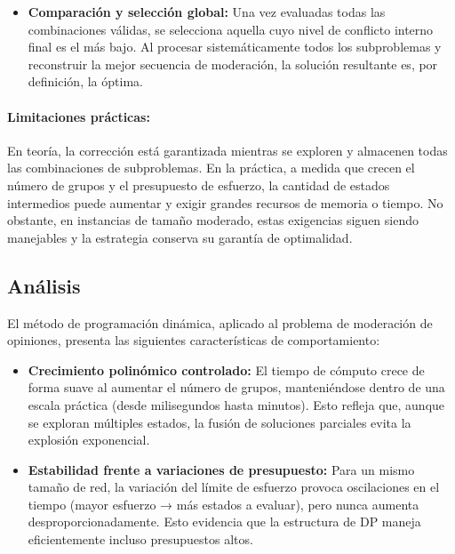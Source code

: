 \documentclass[11pt,letter]{article}
\begin{document}
\begin{itemize}
\begin{itemize}
      \item \textbf{Comparación y selección global:}
      Una vez evaluadas todas las combinaciones válidas, se selecciona aquella cuyo nivel de conflicto interno final es el más bajo. Al procesar sistemáticamente todos los subproblemas y reconstruir la mejor secuencia de moderación, la solución resultante es, por definición, la óptima.

    \end{itemize}

    \paragraph{Limitaciones prácticas:}

    En teoría, la corrección está garantizada mientras se exploren y almacenen todas las combinaciones de subproblemas. En la práctica, a medida que crecen el número de grupos y el presupuesto de esfuerzo, la cantidad de estados intermedios puede aumentar y exigir grandes recursos de memoria o tiempo. No obstante, en instancias de tamaño moderado, estas exigencias siguen siendo manejables y la estrategia conserva su garantía de optimalidad.

    \subsection{Análisis}

    El método de programación dinámica, aplicado al problema de moderación de opiniones, presenta las siguientes características de comportamiento:

        \begin{itemize}

    \item \textbf{Crecimiento polinómico controlado:}
    El tiempo de cómputo crece de forma suave al aumentar el número de grupos, manteniéndose dentro de una escala práctica (desde milisegundos hasta minutos). Esto refleja que, aunque se exploran múltiples estados, la fusión de soluciones parciales evita la explosión exponencial.


    \item \textbf{Estabilidad frente a variaciones de presupuesto:}
    Para un mismo tamaño de red, la variación del límite de esfuerzo provoca oscilaciones en el tiempo (mayor esfuerzo → más estados a evaluar), pero nunca aumenta desproporcionadamente. Esto evidencia que la estructura de DP maneja eficientemente incluso presupuestos altos.


\end{itemize}
\end{itemize}
\end{document}
